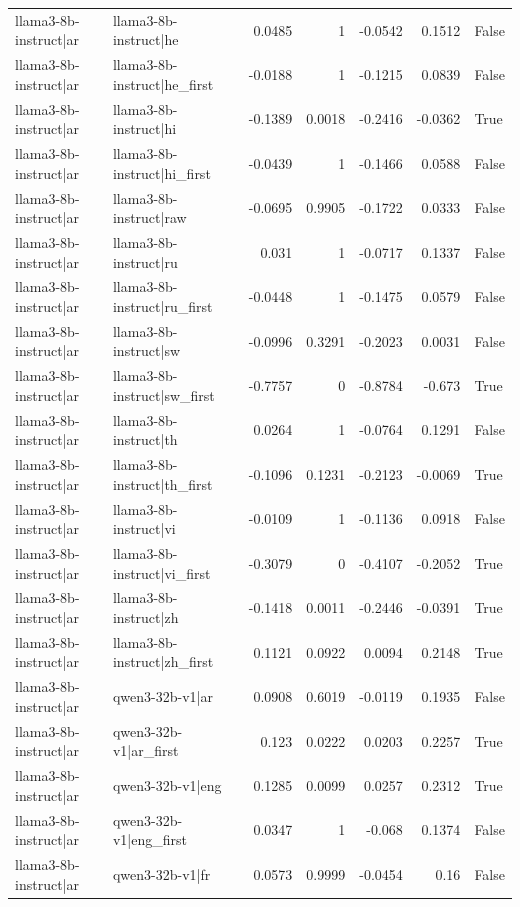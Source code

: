 \begin{table}
\begin{tabular}{l l r r r r l}
llama3-8b-instruct|ar & llama3-8b-instruct|he & 0.0485 & 1 & -0.0542 & 0.1512 & False \\
llama3-8b-instruct|ar & llama3-8b-instruct|he_first & -0.0188 & 1 & -0.1215 & 0.0839 & False \\
llama3-8b-instruct|ar & llama3-8b-instruct|hi & -0.1389 & 0.0018 & -0.2416 & -0.0362 & True \\
llama3-8b-instruct|ar & llama3-8b-instruct|hi_first & -0.0439 & 1 & -0.1466 & 0.0588 & False \\
llama3-8b-instruct|ar & llama3-8b-instruct|raw & -0.0695 & 0.9905 & -0.1722 & 0.0333 & False \\
llama3-8b-instruct|ar & llama3-8b-instruct|ru & 0.031 & 1 & -0.0717 & 0.1337 & False \\
llama3-8b-instruct|ar & llama3-8b-instruct|ru_first & -0.0448 & 1 & -0.1475 & 0.0579 & False \\
llama3-8b-instruct|ar & llama3-8b-instruct|sw & -0.0996 & 0.3291 & -0.2023 & 0.0031 & False \\
llama3-8b-instruct|ar & llama3-8b-instruct|sw_first & -0.7757 & 0 & -0.8784 & -0.673 & True \\
llama3-8b-instruct|ar & llama3-8b-instruct|th & 0.0264 & 1 & -0.0764 & 0.1291 & False \\
llama3-8b-instruct|ar & llama3-8b-instruct|th_first & -0.1096 & 0.1231 & -0.2123 & -0.0069 & True \\
llama3-8b-instruct|ar & llama3-8b-instruct|vi & -0.0109 & 1 & -0.1136 & 0.0918 & False \\
llama3-8b-instruct|ar & llama3-8b-instruct|vi_first & -0.3079 & 0 & -0.4107 & -0.2052 & True \\
llama3-8b-instruct|ar & llama3-8b-instruct|zh & -0.1418 & 0.0011 & -0.2446 & -0.0391 & True \\
llama3-8b-instruct|ar & llama3-8b-instruct|zh_first & 0.1121 & 0.0922 & 0.0094 & 0.2148 & True \\
llama3-8b-instruct|ar & qwen3-32b-v1|ar & 0.0908 & 0.6019 & -0.0119 & 0.1935 & False \\
llama3-8b-instruct|ar & qwen3-32b-v1|ar_first & 0.123 & 0.0222 & 0.0203 & 0.2257 & True \\
llama3-8b-instruct|ar & qwen3-32b-v1|eng & 0.1285 & 0.0099 & 0.0257 & 0.2312 & True \\
llama3-8b-instruct|ar & qwen3-32b-v1|eng_first & 0.0347 & 1 & -0.068 & 0.1374 & False \\
llama3-8b-instruct|ar & qwen3-32b-v1|fr & 0.0573 & 0.9999 & -0.0454 & 0.16 & False \\

\end{tabular}
\end{table}
